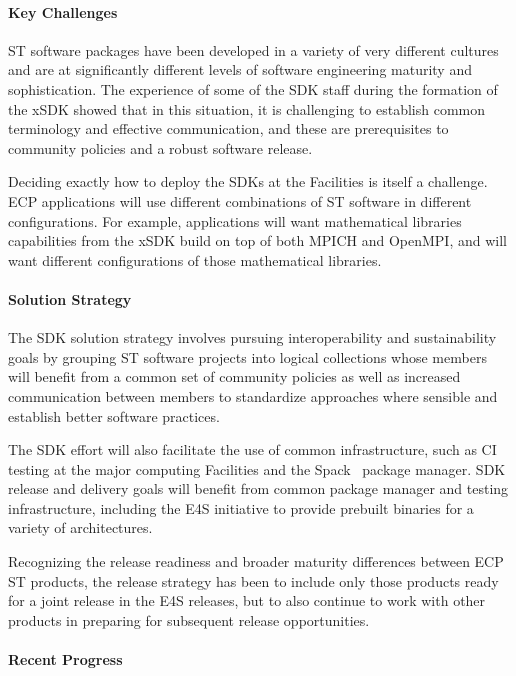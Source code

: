 \paragraph{Key  Challenges}
ST software packages have been developed in a variety of very different cultures and are at significantly different levels of software engineering maturity and sophistication. The experience of some of the SDK staff during the formation of the xSDK showed that in this situation, it is challenging to establish common terminology and effective communication, and these are prerequisites to community policies and a robust software release.

Deciding exactly how to deploy the SDKs at the Facilities is itself a challenge. ECP applications will use different combinations of ST software in different configurations. For example, applications will want mathematical libraries capabilities from the xSDK build on top of both MPICH and OpenMPI, and will want different configurations of those mathematical libraries.

\paragraph{Solution Strategy}
The SDK solution strategy involves pursuing interoperability and sustainability goals by grouping ST software projects into logical collections whose members will benefit from a common set of community policies as well as increased communication between members to standardize approaches where sensible and establish better software practices. 

The SDK effort will also facilitate the use of common infrastructure, such as CI testing at the major computing Facilities and the Spack~\cite{gamblin+:sc15} package manager. SDK release and delivery goals will benefit from common package manager and testing infrastructure, including the E4S initiative to provide prebuilt binaries for a variety of architectures.

Recognizing the release readiness and broader maturity differences between ECP ST products, the release strategy has been to include only those products ready for a joint release in the E4S releases, but to also continue to work with other products in preparing for subsequent release opportunities.

\paragraph{Recent Progress}


